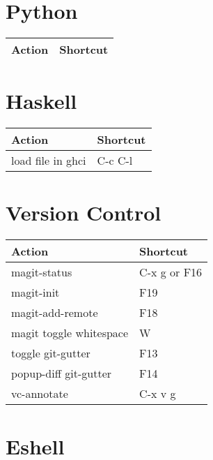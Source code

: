 \documentclass[english]{rcalibritwocolumn}
\begin{document}
\section{Python}
\label{sec-11}


\begin{center}
\begin{tabular}{ll}
 \textbf{Action}  &  \textbf{Shortcut}  \\
\hline
\end{tabular}
\end{center}
\section{Haskell}
\label{sec-12}


\begin{center}
\begin{tabular}{ll}
 \textbf{Action}    &  \textbf{Shortcut}  \\
\hline
 load file in ghci  &  C-c C-l            \\
\end{tabular}
\end{center}
\section{Version Control}
\label{sec-13}


\begin{center}
\begin{tabular}{ll}
 \textbf{Action}          &  \textbf{Shortcut}  \\
\hline
 magit-status             &  C-x g or F16       \\
 magit-init               &  F19                \\
 magit-add-remote         &  F18                \\
 magit toggle whitespace  &  W                  \\
 toggle git-gutter        &  F13                \\
 popup-diff git-gutter    &  F14                \\
 vc-annotate              &  C-x v g            \\
\end{tabular}
\end{center}
\section{Eshell}
\label{sec-14}
\end{document}
